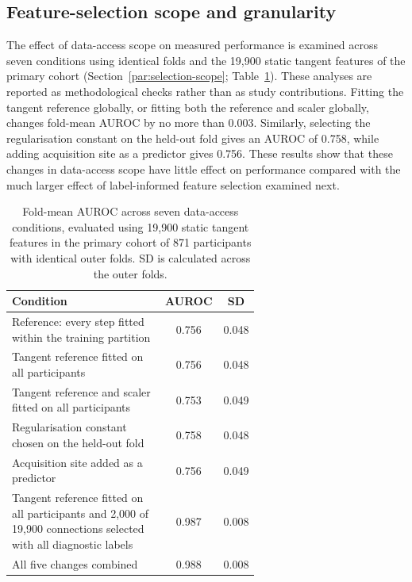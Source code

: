 \subsection{Feature-selection scope and granularity}
\label{subsec:results-selection-scope}

The effect of data-access scope on measured performance is examined across seven conditions using identical folds and the 19,900 static tangent features of the primary cohort (Section~\ref{par:selection-scope}; Table~\ref{tab:selection-scope}). These analyses are reported as methodological checks rather than as study contributions. Fitting the tangent reference globally, or fitting both the reference and scaler globally, changes fold-mean AUROC by no more than 0.003. Similarly, selecting the regularisation constant on the held-out fold gives an AUROC of 0.758, while adding acquisition site as a predictor gives 0.756. These results show that these changes in data-access scope have little effect on performance compared with the much larger effect of label-informed feature selection examined next.

\begin{table}[t]
\centering
\caption{Fold-mean AUROC across seven data-access conditions, evaluated using 19,900 static tangent features in the primary cohort of 871 participants with identical outer folds. SD is calculated across the outer folds.}
\label{tab:selection-scope}
\small
\begin{tabular}{@{}>{\raggedright\arraybackslash}p{0.62\linewidth}cc@{}}
\toprule
Condition & AUROC & SD \\
\midrule
Reference: every step fitted within the training partition & 0.756 & 0.048 \\
Tangent reference fitted on all participants & 0.756 & 0.048 \\
Tangent reference and scaler fitted on all participants & 0.753 & 0.049 \\
Regularisation constant chosen on the held-out fold & 0.758 & 0.048 \\
Acquisition site added as a predictor & 0.756 & 0.049 \\
Tangent reference fitted on all participants and 2,000 of 19,900 connections selected with all diagnostic labels & 0.987 & 0.008 \\
All five changes combined & 0.988 & 0.008 \\
\bottomrule
\end{tabular}
\end{table}

